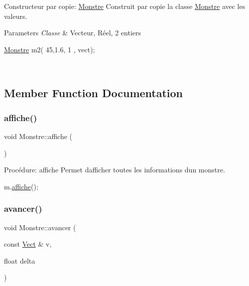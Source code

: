 Constructeur par copie\+: \hyperlink{classMonstre}{Monstre} Construit par copie la classe \hyperlink{classMonstre}{Monstre} avec les valeurs. 


\begin{DoxyParams}{Parameters}
{\em Classe} & Vecteur, Réel, 2 entiers 
\begin{DoxyCode}
\hyperlink{classMonstre}{Monstre} m2(  45,1.6, 1 , vect);
\end{DoxyCode}
 \\
\hline
\end{DoxyParams}


\subsection{Member Function Documentation}
\mbox{\label{classMonstre_ac6700482d005ec983746983f76ad0088}} 
\subsubsection{\texorpdfstring{affiche()}{affiche()}}
{\footnotesize\ttfamily void Monstre\+::affiche (\begin{DoxyParamCaption}{ }\end{DoxyParamCaption})}



Procédure\+: affiche Permet d\textquotesingle{}afficher toutes les informations d\textquotesingle{}un monstre. 


\begin{DoxyCode}
m.\hyperlink{classMonstre_ac6700482d005ec983746983f76ad0088}{affiche}();
\end{DoxyCode}
 \mbox{\label{classMonstre_a5fed7574a7a621251d313219c0831b09}} 
\subsubsection{\texorpdfstring{avancer()}{avancer()}}
{\footnotesize\ttfamily void Monstre\+::avancer (\begin{DoxyParamCaption}\item[{const \hyperlink{classVect}{Vect} \&}]{v,  }\item[{float}]{delta }\end{DoxyParamCaption})}



